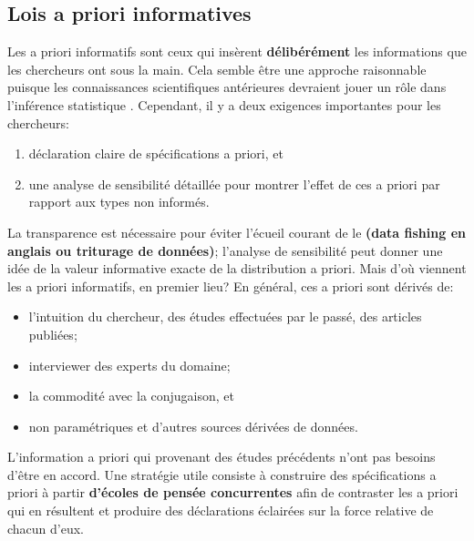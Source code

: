 \subsection{Lois a priori informatives}
 Les a priori informatifs sont ceux qui insèrent \textbf{délibérément} les informations que les chercheurs ont sous la main. Cela semble être une approche raisonnable puisque les connaissances scientifiques antérieures devraient jouer un rôle dans l'inférence statistique . Cependant, il y a deux exigences importantes pour les chercheurs: \begin{enumerate}[noitemsep]
\item déclaration claire de spécifications a priori, et 
\item une analyse de sensibilité détaillée pour montrer l'effet de ces a priori par rapport aux types non informés.
\end{enumerate}
La transparence est nécessaire pour éviter l'écueil courant de le \textbf{(data fishing en anglais ou triturage de données)}; l'analyse de sensibilité peut donner une idée de la valeur informative exacte de la distribution a priori. Mais d'où viennent les a priori informatifs, en premier lieu? En général, ces a priori sont dérivés de:
\begin{itemize}[noitemsep]
	\item l'intuition du chercheur, des études effectuées par le passé, des articles publiées;
	\item interviewer des experts du domaine;
	\item la commodité avec la conjugaison, et 
	\item non paramétriques et d'autres sources dérivées de données.
\end{itemize}
L'information a priori qui provenant des études précédents n'ont pas besoins d'être en accord.  Une stratégie utile consiste à construire des spécifications a priori à partir \textbf{d'écoles de pensée concurrentes} afin de contraster les a priori qui en résultent et produire des déclarations éclairées sur la force relative de chacun d'eux. 


